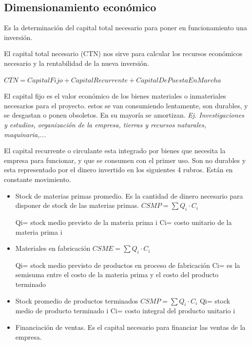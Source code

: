 \documentclass[titlepage,a4paper]{article}
\begin{document}
\newpage

\subsection{Dimensionamiento económico}
Es la determinación del capital total necesario para poner en funcionamiento una inversión.

El capital total necesario (CTN) nos sirve para calcular los recursos económicos necesario y la rentabilidad de la nueva inversión.

\begin{math}
CTN = CapitalFijo + CapitalRecurrente + CapitalDePuestaEnMarcha
\end{math}

El capital fijo es el valor económico de los bienes materiales o inmateriales necesarios para el proyecto. estos se van consumiendo lentamente, son durables, y se desgastan o ponen obsoletos. En su mayoría se amortizan. \textit{Ej. Investigaciones y estudios, organización de la empresa, tierras y recursos naturales, maquinaria,...}

El capital recurrente o circulante esta integrado por bienes que necesita la empresa para funcionar, y que se consumen con el primer uso. Son no durables y esta representado por el dinero invertido en los siguientes 4 rubros. Están en constante movimiento.
\begin{itemize}
    \item Stock de materias primas promedio. Es la cantidad de dinero necesario para disponer de stock de las materias primas. 
        \begin{math}
        CSMP = \sum Q_i \cdot C_i
        \end{math}
        
        Qi= stock medio previsto de la materia prima i
        Ci= costo unitario de la materia prima i
    \item Materiales en fabricación
        \begin{math}
        CSME = \sum Q_i \cdot C_i
        \end{math}
        
        Qi= stock medio previsto de productos en proceso de fabricación
        Ci= es la semisuma entre el costo de la materia prima y el costo del producto terminado
    \item Stock promedio de productos terminados
        \begin{math}
        CSMP = \sum Q_i \cdot C_i
        \end{math}
        Qi= stock medio de producto terminado i
        Ci= costo integral del producto unitario i
    \item Financiación de ventas. Es el capital necesario para financiar las ventas de la empresa.
\end{itemize}
\end{document}
